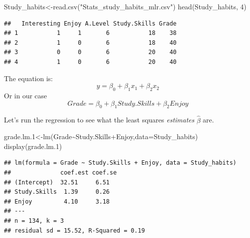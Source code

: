 \documentclass[
]{gitbook}
\newenvironment{Shaded}{\begin{snugshade}}{\end{snugshade}}
\newcommand{\AttributeTok}[1]{\textcolor[rgb]{0.77,0.63,0.00}{#1}}
\newcommand{\DecValTok}[1]{\textcolor[rgb]{0.00,0.00,0.81}{#1}}
\newcommand{\FloatTok}[1]{\textcolor[rgb]{0.00,0.00,0.81}{#1}}
\newcommand{\FunctionTok}[1]{\textcolor[rgb]{0.00,0.00,0.00}{#1}}
\newcommand{\NormalTok}[1]{#1}
\newcommand{\OtherTok}[1]{\textcolor[rgb]{0.56,0.35,0.01}{#1}}
\newcommand{\SpecialCharTok}[1]{\textcolor[rgb]{0.00,0.00,0.00}{#1}}
\newcommand{\StringTok}[1]{\textcolor[rgb]{0.31,0.60,0.02}{#1}}
\begin{document}
\begin{Shaded}
\begin{Highlighting}[]
\NormalTok{Study\_habits}\OtherTok{\textless{}{-}}\FunctionTok{read.csv}\NormalTok{(}\StringTok{"Stats\_study\_habits\_mlr.csv"}\NormalTok{)}
\FunctionTok{head}\NormalTok{(Study\_habits, }\DecValTok{4}\NormalTok{)}
\end{Highlighting}
\end{Shaded}

\begin{verbatim}
##   Interesting Enjoy A.Level Study.Skills Grade
## 1           1     1       6           18    38
## 2           1     0       6           18    40
## 3           0     0       6           20    40
## 4           1     0       6           20    40
\end{verbatim}

The equation is:
\[ y = \beta_0+ \beta_1 x_1 + \beta_2 x_2\]
Or in our case
\[ Grade =  \beta_0 + \beta_1 Study.Skills+ \beta_2 Enjoy\]

\newpage

Let's run the regression to see what the least squares \emph{estimates} \(\hat{\beta}\) are.

\begin{Shaded}
\begin{Highlighting}[]
\NormalTok{grade.lm}\FloatTok{.1}\OtherTok{\textless{}{-}}\FunctionTok{lm}\NormalTok{(Grade}\SpecialCharTok{\textasciitilde{}}\NormalTok{Study.Skills}\SpecialCharTok{+}\NormalTok{Enjoy,}\AttributeTok{data=}\NormalTok{Study\_habits)}
\FunctionTok{display}\NormalTok{(grade.lm}\FloatTok{.1}\NormalTok{)}
\end{Highlighting}
\end{Shaded}

\begin{verbatim}
## lm(formula = Grade ~ Study.Skills + Enjoy, data = Study_habits)
##              coef.est coef.se
## (Intercept)  32.51     6.51  
## Study.Skills  1.39     0.26  
## Enjoy         4.10     3.18  
## ---
## n = 134, k = 3
## residual sd = 15.52, R-Squared = 0.19
\end{verbatim}
\end{document}

